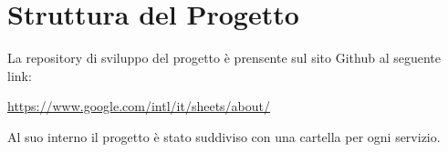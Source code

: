 \chapter{Struttura del Progetto}
La repository di sviluppo del progetto è prensente sul sito Github al seguente link:
\begin{center}
	\url{https://www.google.com/intl/it/sheets/about/}
\end{center}
Al suo interno il progetto è stato suddiviso con una cartella per ogni servizio.